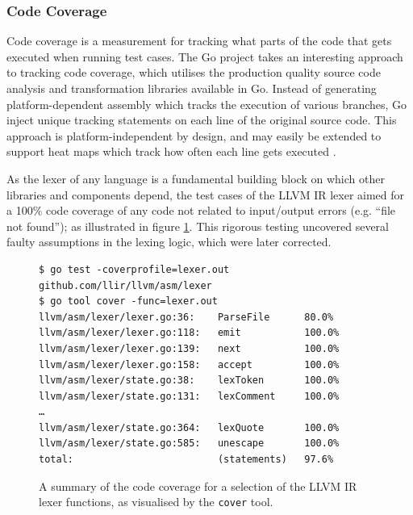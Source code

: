 
\subsubsection{Code Coverage}
\label{sec:ver_code_coverage}

Code coverage is a measurement for tracking what parts of the code that gets executed when running test cases. The Go project takes an interesting approach to tracking code coverage, which utilises the production quality source code analysis and transformation libraries available in Go. Instead of generating platform-dependent assembly which tracks the execution of various branches, Go inject unique tracking statements on each line of the original source code. This approach is platform-independent by design, and may easily be extended to support heat maps which track how often each line gets executed \cite{go_cover}.

As the lexer of any language is a fundamental building block on which other libraries and components depend, the test cases of the LLVM IR lexer aimed for a 100\% code coverage of any code not related to input/output errors (e.g. ``file not found''); as illustrated in figure \ref{fig:lexer_code_coverage}. This rigorous testing uncovered several faulty assumptions in the lexing logic, which were later corrected.

\begin{figure}[htbp]
	\begin{center}
		\begin{verbatim}
$ go test -coverprofile=lexer.out github.com/llir/llvm/asm/lexer
$ go tool cover -func=lexer.out
llvm/asm/lexer/lexer.go:36:    ParseFile      80.0%
llvm/asm/lexer/lexer.go:118:   emit           100.0%
llvm/asm/lexer/lexer.go:139:   next           100.0%
llvm/asm/lexer/lexer.go:158:   accept         100.0%
llvm/asm/lexer/state.go:38:    lexToken       100.0%
llvm/asm/lexer/state.go:131:   lexComment     100.0%
…
llvm/asm/lexer/state.go:364:   lexQuote       100.0%
llvm/asm/lexer/state.go:585:   unescape       100.0%
total:                         (statements)   97.6%
		\end{verbatim}
		\caption{A summary of the code coverage for a selection of the LLVM IR lexer functions, as visualised by the \texttt{cover} tool.}
		\label{fig:lexer_code_coverage}
	\end{center}
\end{figure}

